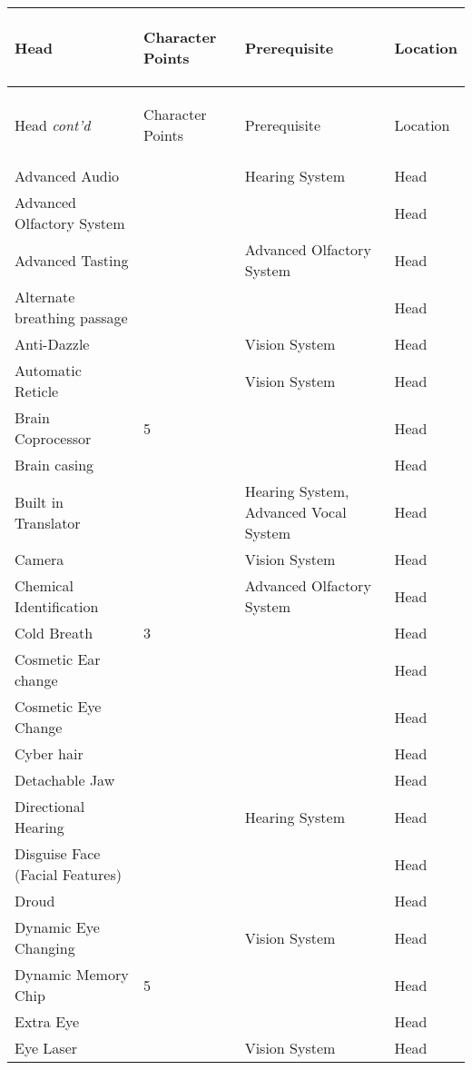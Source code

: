 \documentclass[twoside]{book}
\begin{document}
\begin{longtable}{p{1.25in}p{2em}ll} 
  Head& \begin{turn}{70}{Character Points}\end{turn}
          & \begin{turn}{70}{Prerequisite}\end{turn}
          & \begin{turn}{70}{Location}\end{turn}
          \\
  \hline
  \hline
  \endfirsthead
  Head \textit{cont'd}
        & \begin{turn}{70}{Character Points}\end{turn}
          & \begin{turn}{70}{Prerequisite}\end{turn}
          & \begin{turn}{70}{Location}\end{turn}
           \\
  \hline
  \endhead
\raggedright  Advanced Audio&& Hearing System& Head\tabularnewline
      \raggedright  Advanced Olfactory System&&& Head\tabularnewline
      \raggedright  Advanced Tasting&& Advanced Olfactory
           System& Head\tabularnewline
      \raggedright  Alternate breathing passage&&& Head\tabularnewline
      \raggedright  Anti-Dazzle&& Vision System& Head\tabularnewline
      \raggedright  Automatic Reticle&& Vision System& Head\tabularnewline
      \raggedright  Brain Coprocessor& 5&& Head\tabularnewline
      \raggedright  Brain casing&&& Head\tabularnewline
      \raggedright  Built in Translator&& Hearing System,
           Advanced Vocal System& Head\tabularnewline
      \raggedright  Camera&& Vision System& Head\tabularnewline
      \raggedright  Chemical Identification&& Advanced Olfactory
           System& Head\tabularnewline
      \raggedright  Cold Breath& 3&& Head\tabularnewline
      \raggedright  Cosmetic Ear change&&& Head\tabularnewline
      \raggedright  Cosmetic Eye Change&&& Head\tabularnewline
      \raggedright  Cyber hair&&& Head\tabularnewline
      \raggedright  Detachable Jaw&&& Head\tabularnewline
      \raggedright  Directional Hearing&& Hearing System& Head\tabularnewline
      \raggedright  Disguise Face (Facial Features)&&& Head\tabularnewline
      \raggedright  Droud&&& Head\tabularnewline
      \raggedright  Dynamic Eye Changing&& Vision System& Head\tabularnewline
      \raggedright  Dynamic Memory Chip& 5&& Head\tabularnewline
      \raggedright  Extra Eye&&& Head\tabularnewline
      \raggedright  Eye Laser&& Vision System& Head\tabularnewline

\end{longtable}
\end{document}
